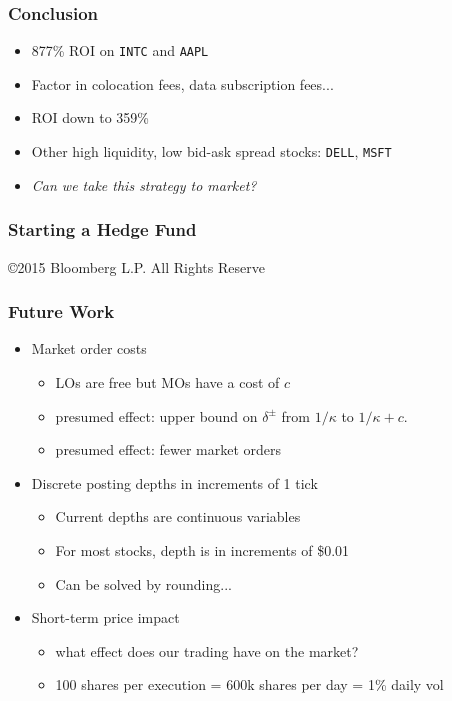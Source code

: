 \begin{frame}
\frametitle{Conclusion}
\begin{itemize}
\item 877\% ROI on \texttt{INTC} and \texttt{AAPL}
\item Factor in colocation fees, data subscription fees...
\item ROI down to 359\%
\item Other high liquidity, low bid-ask spread stocks: \texttt{DELL}, \texttt{MSFT}
\item \emph{Can we take this strategy to market?}
\end{itemize}
\end{frame}

\begin{frame}
\frametitle{Starting a Hedge Fund}
\begin{center}
\end{center}
{\tiny ©2015 Bloomberg L.P. All Rights Reserve}
\end{frame}

\begin{frame}
\frametitle{Future Work}
\begin{itemize}
\item Market order costs
\begin{itemize}
\item LOs are free but MOs have a cost of $c$
\item presumed effect: upper bound on $\delta^\pm$ from $1/\kappa$ to $1/\kappa + c$.
\item presumed effect: fewer market orders
\end{itemize}
\item Discrete posting depths in increments of 1 tick
\begin{itemize}
\item Current depths are continuous variables
\item For most stocks, depth is in increments of \$0.01
\item Can be solved by rounding...
\end{itemize}
\item Short-term price impact
\begin{itemize}
\item what effect does our trading have on the market?
\item 100 shares per execution = 600k shares per day = 1\% daily vol
\end{itemize}
\end{itemize}
\end{frame}

